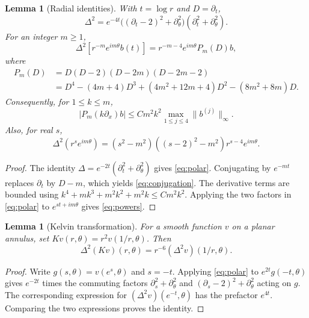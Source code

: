 \documentclass[11pt,twoside,leqno]{article}
\numberwithin{equation}{section}
\newtheorem{lemma}[theorem]{Lemma}
\theoremstyle{definition}
\theoremstyle{remark}
\begin{document}
\begin{lemma}[Radial identities]\label{lem:radial}
With $t=\log r$ and $D=\partial_t$,
\begin{equation}\label{eq:polar}
 \Delta^2=e^{-4t}\bigl((\partial_t-2)^2+\partial_\theta^2\bigr)
                         (\partial_t^2+\partial_\theta^2).
\end{equation}
For an integer $m\ge1$,
\begin{equation}\label{eq:conjugation}
 \Delta^2[r^{-m}e^{im\theta}b(t)]
 =r^{-m-4}e^{im\theta}P_m(D)b,
\end{equation}
where
\begin{align*}
 P_m(D)&=D(D-2)(D-2m)(D-2m-2)\\
 &=D^4-(4m+4)D^3+(4m^2+12m+4)D^2-(8m^2+8m)D.
\end{align*}
Consequently, for $1\le k\le m$,
\begin{equation}\label{eq:radial-cost}
 |P_m(k\partial_x)b|
 \le Cm^2k^2\max_{1\le j\le4}\|b^{(j)}\|_\infty.
\end{equation}
Also, for real $s$,
\begin{equation}\label{eq:powers}
 \Delta^2(r^se^{im\theta})
 =(s^2-m^2)((s-2)^2-m^2)r^{s-4}e^{im\theta}.
\end{equation}
\end{lemma}
\begin{proof}
The identity $\Delta=e^{-2t}(\partial_t^2+\partial_\theta^2)$
gives \eqref{eq:polar}. Conjugating by $e^{-mt}$ replaces
$\partial_t$ by $D-m$, which yields \eqref{eq:conjugation}.
The derivative terms are bounded using
$k^4+mk^3+m^2k^2+m^2k\le Cm^2k^2$.
Applying the two factors in \eqref{eq:polar} to $e^{st+im\theta}$
gives \eqref{eq:powers}.
\end{proof}

\begin{lemma}[Kelvin transformation]\label{lem:kelvin}
For a smooth function $v$ on a planar annulus, set
$Kv(r,\theta)=r^2v(1/r,\theta)$. Then
\begin{equation}\label{eq:kelvin}
 \Delta^2(Kv)(r,\theta)=r^{-6}(\Delta^2v)(1/r,\theta).
\end{equation}
\end{lemma}
\begin{proof}
Write $g(s,\theta)=v(e^s,\theta)$ and $s=-t$.
Applying \eqref{eq:polar} to $e^{2t}g(-t,\theta)$ gives $e^{-2t}$
times the commuting factors
$\partial_s^2+\partial_\theta^2$ and
$(\partial_s-2)^2+\partial_\theta^2$ acting on $g$.
The corresponding expression for $(\Delta^2v)(e^{-t},\theta)$
has the prefactor $e^{4t}$. Comparing the two expressions proves the
identity.
\end{proof}
\end{document}
